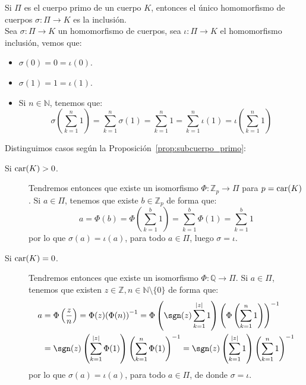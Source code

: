 \begin{ejercicio} \label{ej:homomorfismo_primo}
    Si $\Pi$ es el cuerpo primo de un cuerpo $K$, entonces el único homomorfismo de cuerpos $\sigma:\Pi\to K$ es la inclusión.\\ 

    \noindent
    Sea $\sigma:\Pi\to K$ un homomorfismo de cuerpos, sea $\iota:\Pi\to K$ el homomorfismo inclusión, vemos que:
    \begin{itemize}
        \item $\sigma(0) = 0 = \iota(0)$.
        \item $\sigma(1) = 1 = \iota(1)$.
        \item Si $n\in \mathbb{N}$, tenemos que:
            \begin{equation*}
                \sigma\left(\sum_{k=1}^{n}1\right) = \sum_{k=1}^{n}\sigma(1) = \sum_{k=1}^{n}1 = \sum_{k=1}^{n}\iota(1) = \iota\left(\sum_{k=1}^{n}1\right)
            \end{equation*}
    \end{itemize}
    Distinguimos casos según la Proposición~\ref{prop:subcuerpo_primo}:
    \begin{description}
        \item [Si $\operatorname{car}(K) > 0$.] Tendremos entonces que existe un isomorfismo $\Phi:\mathbb{Z}_p\to \Pi$ para $p=\operatorname{car}(K)$. Si $a\in \Pi$, tenemos que existe $b\in \mathbb{Z}_p$ de forma que:
            \begin{equation*}
                a = \Phi(b) = \Phi\left(\sum_{k=1}^{b}1\right) = \sum_{k=1}^{b} \Phi (1) = \sum_{k=1}^{b} 1
            \end{equation*}
            por lo que $\sigma(a) = \iota(a)$, para todo $a\in \Pi$, luego $\sigma=\iota$.
        \item [Si $\operatorname{car}(K)=0$.] Tendremos entonces que existe un isomorfismo $\Phi:\mathbb{Q}\to \Pi$. Si $a\in \Pi$, tenemos que existen $z\in \mathbb{Z}, n\in \mathbb{N}\setminus\{0\}$ de forma que:
            \begin{align*}
                a &= \Phi\left(\frac{z}{n}\right) = \Phi(z){(\Phi(n))}^{-1} = \Phi\left(\sgn(z)\sum_{k=1}^{|z|}1\right){\left(\Phi\left(\sum_{k=1}^{n}1\right)\right)}^{-1} \\ 
                  &= \sgn(z)\left(\sum_{k=1}^{|z|}\Phi(1)\right){\left(\sum_{k=1}^{n}\Phi(1)\right)}^{-1}= \sgn(z)\left(\sum_{k=1}^{|z|}1\right){\left(\sum_{k=1}^{n}1\right)}^{-1}
            \end{align*}
            por lo que $\sigma(a) = \iota(a)$, para todo $a\in \Pi$, de donde $\sigma=\iota$.
    \end{description}
\end{ejercicio}

